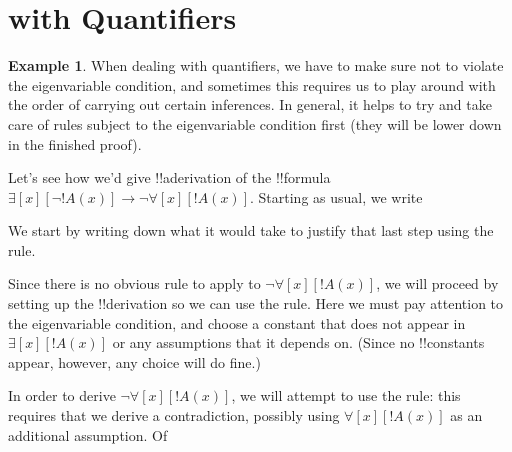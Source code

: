 \documentclass[10pt,a4paper]{article}
\theoremstyle{plain}
\theoremstyle{definition}
\newtheorem{ex}[thm]{Example}
\theoremstyle{remark}
\newcommand*{\olfileid}[3]{}
\newcommand*{\olsection}[1]{\section*{#1}}
\providecommand{\AxiomC}[1]{}
\providecommand{\UnaryInfC}[1]{}
\providecommand{\BinaryInfC}[1]{}
\newenvironment{prooftree}{}{}
\providecommand{\lif}{\mathbin{\rightarrow}}
\providecommand{\lforall}{\mathord{\forall}}
\providecommand{\lexists}{\mathord{\exists}}
\providecommand{\Elim}[1]{}
\providecommand{\Intro}[1]{}
\providecommand{\Discharge}{\mathrm{Dis}}
\providecommand{\Intro}{\mathrm{I}}
\begin{document}



\olfileid{fol}{ntd}{prq}

\olsection{ with Quantifiers}

\begin{ex}
When dealing with quantifiers, we have to make sure not to violate the
eigenvariable condition, and sometimes this requires us to play around
with the order of carrying out certain inferences. In general, it
helps to try and take care of rules subject to the eigenvariable
condition first (they will be lower down in the finished proof).

Let's see how we'd give !!a{derivation} of the !!{formula}
$\lexists[x][\lnot !A(x)] \lif \lnot \lforall[x][!A(x)]$.
Starting as usual, we write
\begin{prooftree}
\AxiomC{}
\UnaryInfC{$\lexists[x][\lnot !A(x)]\lif \lnot \lforall[x][!A(x)]$}
\end{prooftree}
We start by writing down what it would take to justify that last step
using the \Intro{\lif} rule.
\begin{prooftree}
\AxiomC{$\Discharge{\lexists[x][\lnot !A(x)]}{1}$}
\DeduceC{$\lnot \lforall[x][!A(x)]$}
\DischargeRule{\Intro{\lif}}{1}
\UnaryInfC{$\lexists[x][\lnot !A(x)]\lif \lnot \lforall[x][!A(x)]$}
\end{prooftree}
Since there is no obvious rule to apply to $\lnot \lforall[x][!A(x)]$,
we will proceed by setting up the !!{derivation} so we can use the
\Elim{\lexists} rule. Here we must pay attention to the eigenvariable
condition, and choose a constant that does not appear in
$\lexists[x][!A(x)]$ or any assumptions that it depends on.
(Since no !!{constant}s appear, however, any choice will do fine.)
\begin{prooftree}
\AxiomC{$\Discharge{\lexists[x][\lnot !A(x)]}{1}$}
\AxiomC{$\Discharge{\lnot !A(a)}{2}$}
\DeduceC{$\lnot \lforall[x][!A(x)]$}
\DischargeRule{\Elim{\lexists}}{2}
\BinaryInfC{$\lnot \lforall[x][!A(x)]$}
\DischargeRule{\Intro{\lif}}{1}
\UnaryInfC{$\lexists[x][\lnot !A(x)] \lif \lnot \lforall[x][!A(x)]$}
\end{prooftree}
In order to derive $\lnot \lforall[x][!A(x)]$, we will attempt to use
the \Intro{\lnot} rule: this requires that we derive a contradiction,
possibly using $\lforall[x][!A(x)]$ as an additional assumption. Of

\end{ex}
\end{document}
